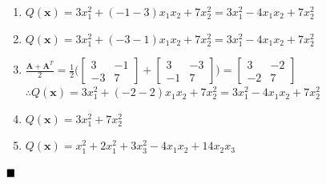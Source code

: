 \documentclass[a4paper]{article}
\numberwithin{equation}{section} %
\newcommand{\qedblack}{$\hfill\blacksquare$} %
\begin{document}
  \begin{enumerate} [label=(\alph*)]
  \item $Q(\textbf{x})=3x_{1}^{2}+(-1-3)x_{1}x_{2}+7x_{2}^{2}=3x_{1}^{2}-4x_{1}x_{2}+7x_{2}^{2}$
  \item $Q(\textbf{x})=3x_{1}^{2}+(-3-1)x_{1}x_{2}+7x_{2}^{2}=3x_{1}^{2}-4x_{1}x_{2}+7x_{2}^{2}$
  \item $\frac{\textbf{A}+\textbf{A}^{T}}{2}=
    \frac{1}{2}\bigg(\begin{bmatrix}
    3 & -1\\
    -3 & 7
    \end{bmatrix}+
    \begin{bmatrix}
    3 & -3\\
    -1 & 7
    \end{bmatrix}\bigg)=
    \begin{bmatrix}
    3 & -2\\
    -2 & 7
    \end{bmatrix}$\\
    $\therefore Q(\textbf{x})=3x_{1}^{2}+(-2-2)x_{1}x_{2}+7x_{2}^{2}=3x_{1}^{2}-4x_{1}x_{2}+7x_{2}^{2}$
  \item $Q(\textbf{x})=3x_{1}^{2}+7x_{2}^{2}$
  \item $Q(\textbf{x})=x_{1}^{2}+2x_{1}^{2}+3x_{3}^{2}-4x_{1}x_{2}+14x_{2}x_{3}$
\end{enumerate}
\qedblack
\end{document}
